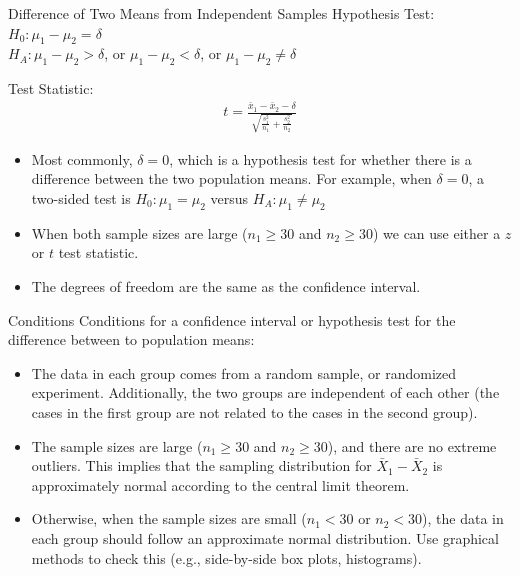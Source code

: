 \documentclass[10pt, fleqn]{beamer}
\begin{document}
\begin{frame}{Difference of Two Means from Independent Samples}
Hypothesis Test:\\
$H_0: \mu_1 - \mu_2 = \delta$\\
$H_A: \mu_1 - \mu_2 > \delta$, or $\mu_1 - \mu_2 < \delta$, or $\mu_1 - \mu_2 \neq \delta$\\
\bigskip

Test Statistic:
\begin{align*}
t = \frac{\bar{x}_1 - \bar{x}_2 - \delta}{\sqrt{\frac{s_1^2}{n_1} + \frac{s_2^2}{n_2}}}
\end{align*}

\small
\begin{itemize}
\item Most commonly, $\delta=0$, which is a hypothesis test for whether there is a difference between the two population means.  For example, when $\delta=0$, a two-sided test is $H_0: \mu_1 = \mu_2$ versus $H_A: \mu_1 \neq \mu_2$
\item When both sample sizes are large ($n_1 \geq 30$ and $n_2 \geq 30$) we can use either a $z$ or $t$ test statistic.
\item The degrees of freedom are the same as the confidence interval.
\end{itemize}
\end{frame}

\begin{frame}{Conditions}
Conditions for a confidence interval or hypothesis test for the difference between to population means:\\

\begin{itemize}
\item  The data in each group comes from a random sample, or randomized experiment. Additionally, the two groups are independent of each other (the cases in the first group are not related to the cases in the second group).
\vspace{5pt}
\item The sample sizes are large ($n_1 \geq 30$ and $n_2 \geq 30$), and there are no extreme outliers. This implies that the sampling distribution for $\bar{X}_1 - \bar{X}_2$ is approximately normal according to the central limit theorem.   
\vspace{5pt}
\item Otherwise, when the sample sizes are small ($n_1<30$ or $n_2 < 30$), the data in each group should follow an approximate normal distribution. Use graphical methods to check this (e.g., side-by-side box plots, histograms).
\end{itemize}
\end{frame}
\end{document}

